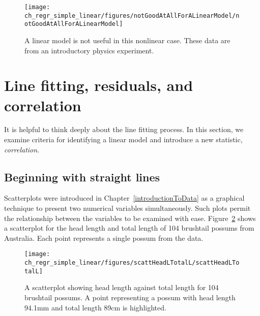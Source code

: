 \begin{figure}
   \centering
   \texttt{[image: ch\_regr\_simple\_linear/figures/notGoodAtAllForALinearModel/notGoodAtAllForALinearModel]}
   \caption{A linear model is not useful in this nonlinear case. These data are from an introductory physics experiment.}
   \label{notGoodAtAllForALinearModel}
\end{figure}



\textC{\newpage}



\section[Line fitting, residuals, and correlation]{Line fitting, residuals, and correlation ~}
\label{lineFittingResidualsCorrelation}

It is helpful to think deeply about the line fitting process. In this section, we examine criteria for identifying a linear model and introduce a new statistic, \emph{correlation}.

\subsection{Beginning with straight lines}


Scatterplots were introduced in Chapter~\ref{introductionToData} as a graphical technique to present two numerical variables simultaneously. Such plots permit the relationship between the variables to be examined with ease. Figure~\ref{scattHeadLTotalL} shows a scatterplot for the head length and total length of 104 brushtail possums from Australia. Each point represents a single possum from the data.

\begin{figure}
   \centering
   \texttt{[image: ch\_regr\_simple\_linear/figures/scattHeadLTotalL/scattHeadLTotalL]}
   \caption{A scatterplot showing head length against total length for 104 brushtail possums. A point representing a possum with head length 94.1mm and total length 89cm is highlighted.}
   \label{scattHeadLTotalL}
\end{figure}

